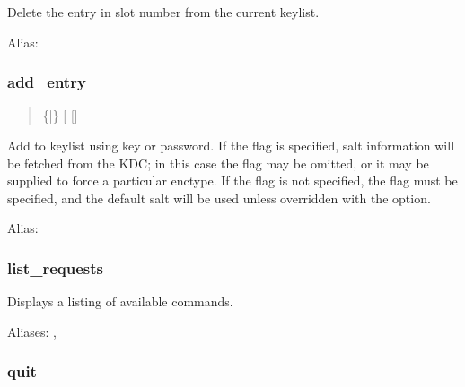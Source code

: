 \documentclass[letterpaper,10pt,english]{sphinxmanual}
\begin{document}
\sphinxAtStartPar
Delete the entry in slot number  from the current keylist.

\sphinxAtStartPar
Alias: 


\subsubsection{add\_entry}
\label{\detokenize{admin/admin_commands/ktutil:add-entry}}\begin{quote}

\sphinxAtStartPar
{} \{|\}  
  {[} \sphinxstyleemphasis{enctype}{]} {[}| \sphinxstyleemphasis{salt}{]}
\end{quote}

\sphinxAtStartPar
Add  to keylist using key or password.  If the  flag
is specified, salt information will be fetched from the KDC; in this
case the  flag may be omitted, or it may be supplied to force a
particular enctype.  If the  flag is not specified, the 
flag must be specified, and the default salt will be used unless
overridden with the  option.

\sphinxAtStartPar
Alias: 


\subsubsection{list\_requests}
\label{\detokenize{admin/admin_commands/ktutil:list-requests}}\begin{quote}

\sphinxAtStartPar
{}
\end{quote}

\sphinxAtStartPar
Displays a listing of available commands.

\sphinxAtStartPar
Aliases: , 


\subsubsection{quit}
\label{\detokenize{admin/admin_commands/ktutil:quit}}\begin{quote}

\sphinxAtStartPar
{}
\end{quote}
\end{document}
